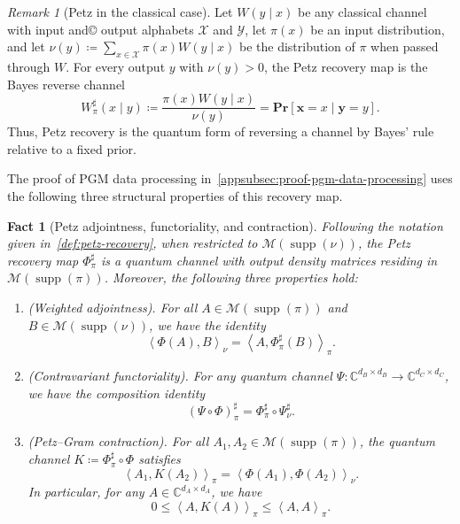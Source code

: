 \documentclass[11pt]{article}
\renewcommand{\leq}{\leqslant}
\newtheorem{fact}[fact]{Fact}
\theoremstyle{remark}
\newtheorem{remark}{Remark}[section]
\newcommand{\cM}{\mathcal{M}}
\newcommand{\cX}{\mathcal{X}}
\newcommand{\cY}{\mathcal{Y}}
\newcommand{\C}{\mathbb{C}}
\newcommand{\supp}{\operatorname{supp}}
\newcommand{\Prb}{\mathbf{Pr}}
\newcommand{\bx}{\mathbf{x}}
\newcommand{\by}{\mathbf{y}}
\newcommand{\inner}[2]{\left\langle #1, #2\right\rangle}
\begin{document}
\begin{remark}[Petz in the classical case]
\label{rem:classical-petz-recovery}
Let $W(y \mid x)$ be any classical channel with input and© output alphabets $\cX$ and $\cY$, let $\pi(x)$ be an input distribution, and let $\nu(y) \coloneqq \sum_{x \in \cX}{\pi(x)W(y \mid x)}$ be the distribution of $\pi$ when passed through $W$. For every output $y$ with $\nu(y) > 0$, the Petz recovery map is the Bayes reverse channel
\begin{equation*}
W_\pi^\sharp(x \mid y)
\coloneqq \frac{\pi(x)W(y \mid x)}{\nu(y)}
= \Prb[\bx = x \mid \by = y].
\end{equation*}
Thus, Petz recovery is the quantum form of reversing a channel by Bayes' rule relative to a fixed prior.
\end{remark}

The proof of PGM data processing in~\cref{appsubsec:proof-pgm-data-processing} uses the following three structural properties of this recovery map.

\begin{fact}[Petz adjointness, functoriality, and contraction]
\label{fact:petz-properties}
Following the notation given in~\cref{def:petz-recovery}, when restricted to $\cM(\supp(\nu))$, the Petz recovery map $\Phi_\pi^\sharp$ is a quantum channel with output density matrices residing in $\cM(\supp(\pi))$. Moreover, the following three properties hold:
\begin{enumerate}
\item\label{item:petz-adjointness} \emph{(Weighted adjointness).} For all $A \in \cM(\supp(\pi))$ and $B \in \cM(\supp(\nu))$, we have the identity
\begin{equation*}
\inner{\Phi(A)}{B}_\nu
= \inner{A}{\Phi_\pi^\sharp(B)}_\pi.
\end{equation*}
\item\label{item:petz-functoriality} \emph{(Contravariant functoriality).} For any quantum channel $\Psi : \C^{d_B \times d_B} \to \C^{d_C \times d_C}$, we have the composition identity
\begin{equation*}
(\Psi\circ\Phi)_\pi^\sharp
= \Phi_\pi^\sharp\circ\Psi_\nu^\sharp.
\end{equation*}
\item\label{item:petz-contraction} \emph{(Petz--Gram contraction).} For all $A_1,A_2 \in \cM(\supp(\pi))$, the quantum channel $K \coloneqq \Phi_\pi^\sharp\circ\Phi$ satisfies
\begin{equation*}
\inner{A_1}{K(A_2)}_\pi
= \inner{\Phi(A_1)}{\Phi(A_2)}_\nu.
\end{equation*}
In particular, for any $A \in \C^{d_A \times d_A}$, we have
\begin{equation}
0 \leq \inner{A}{K(A)}_\pi
\leq \inner{A}{A}_\pi.
\end{equation}
\end{enumerate}
\end{fact}
\end{document}

